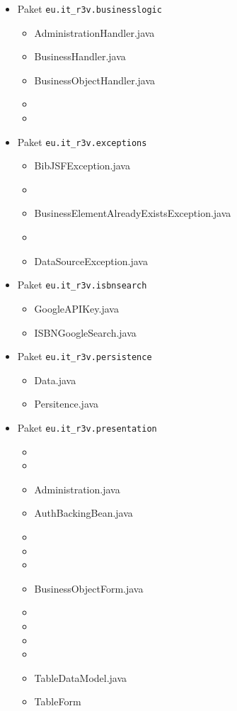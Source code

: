 \documentclass[fontsize=12pt,paper=a4,twoside]{scrartcl}
\begin{document}
\begin{itemize}
\item{Paket \texttt{eu.it\_r3v.businesslogic}}

\begin{itemize}
\item{AdministrationHandler.java}
\item{BusinessHandler.java}
\item{BusinessObjectHandler.java}
\item{}
\item{}
\end{itemize}

\item{Paket \texttt{eu.it\_r3v.exceptions}}

\begin{itemize}
\item{BibJSFException.java}
\item{}
\item{BusinessElementAlreadyExistsException.java}
\item{}
\item{DataSourceException.java}
\end{itemize}

\item{Paket \texttt{eu.it\_r3v.isbnsearch}}

\begin{itemize}
\item{GoogleAPIKey.java}
\item{ISBNGoogleSearch.java}
\end{itemize}

\item{Paket \texttt{eu.it\_r3v.persistence}}
\begin{itemize}
\item{Data.java}
\item{Persitence.java}
\end{itemize}

\item{Paket \texttt{eu.it\_r3v.presentation}}
\begin{itemize}
\item{}
\item{}
\item{Administration.java}
\item{AuthBackingBean.java}
\item{}
\item{}
\item{}
\item{BusinessObjectForm.java}
\item{}
\item{}
\item{}
\item{}
\item{TableDataModel.java}
\item{TableForm}
\end{itemize}


\end{itemize}
\end{document}
